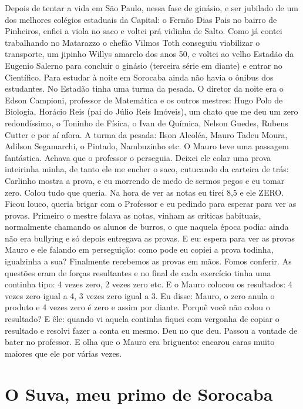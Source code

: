 \documentclass[12pt,brazil,]{book}
\begin{document}
Depois de tentar a vida em São Paulo, nessa fase de ginásio, e ser
jubilado de um dos melhores colégios estaduais da Capital: o Fernão Dias
Pais no bairro de Pinheiros, enfiei a viola no saco e voltei prá vidinha
de Salto. Como já contei trabalhando no Matarazzo o chefão Vilmos Toth
conseguiu viabilizar o transporte, um jipinho Willys amarelo dos anos
50, e voltei ao velho Estadão da Eugenio Salerno para concluir o ginásio
(terceira série em diante) e entrar no Científico. Para estudar à noite
em Sorocaba ainda não havia o ônibus dos estudantes. No Estadão tinha
uma turma da pesada. O diretor da noite era o Edson Campioni, professor
de Matemática e os outros mestres: Hugo Polo de Biologia, Horácio Reis
(pai do Júlio Reis Imóveis), um chato que me deu um zero redondíssimo, o
Toninho de Física, o Ivan de Química, Nelson Guedes, Rubens Cutter e por
aí afora. A turma da pesada: Ilson Alcoléa, Mauro Tadeu Moura, Adilson
Segamarchi, o Pintado, Nambuzinho etc. O Mauro teve uma passagem
fantástica. Achava que o professor o perseguia. Deixei ele colar uma
prova inteirinha minha, de tanto ele me encher o saco, cutucando da
carteira de trás: Carlinho mostra a prova, e eu morrendo de medo de
sermos pegos e eu tomar zero. Colou tudo que queria. Na hora de ver as
notas eu tirei 8,5 e ele ZERO. Ficou louco, queria brigar com o
Professor e eu pedindo para esperar para ver as provas. Primeiro o
mestre falava as notas, vinham as críticas habituais, normalmente
chamando os alunos de burros, o que naquela época podia: ainda não era
bullying e só depois entregava as provas. E eu: espera para ver as
provas Mauro e ele falando em perseguição: como pode eu copiei a prova
todinha, igualzinha a sua? Finalmente recebemos as provas em mãos. Fomos
conferir. As questões eram de forças resultantes e no final de cada
exercício tinha uma continha tipo: 4 vezes zero, 2 vezes zero etc. E o
Mauro colocou os resultados: 4 vezes zero igual a 4, 3 vezes zero igual
a 3. Eu disse: Mauro, o zero anula o produto e 4 vezes zero é zero e
assim por diante. Porquê você não colou o resultado? E êle: quando vi
aquela continha fiquei com vergonha de copiar o resultado e resolvi
fazer a conta eu mesmo. Deu no que deu. Passou a vontade de bater no
professor. E olha que o Mauro era briguento: encarou caras muito maiores
que ele por várias vezes.

\section{O Suva, meu primo de
Sorocaba}\label{o-suva-meu-primo-de-sorocaba}
\end{document}
